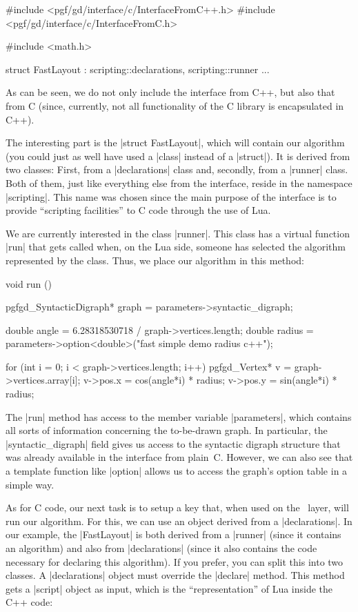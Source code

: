 \begin{codeexample}
#include <pgf/gd/interface/c/InterfaceFromC++.h>
#include <pgf/gd/interface/c/InterfaceFromC.h>

#include <math.h>

struct FastLayout : scripting::declarations, scripting::runner {
  ...
}
\end{codeexample}

As can be seen, we do not only include the interface from C++, but
also that from C (since, currently, not all functionality of the C
library is encapsulated in C++).

The interesting part is the |struct FastLayout|, which will contain our
algorithm (you could just as well have used a |class| instead of a
|struct|). It is derived from two classes: First, from a
|declarations| class and, secondly, from a |runner| class. Both of
them, just like everything else from the interface, reside in the
namespace |scripting|. This name was chosen since the main purpose of
the interface is to provide ``scripting facilities'' to C code through
the use of Lua.

We are currently interested in the class |runner|. This class has a
virtual function |run| that gets called when, on the Lua side, someone
has selected the algorithm represented by the class. Thus, we place
our algorithm in this method:

\begin{codeexample}
void run () {
  pgfgd_SyntacticDigraph* graph = parameters->syntactic_digraph;
    
  double angle  = 6.28318530718 / graph->vertices.length;
  double radius = parameters->option<double>("fast simple demo radius c++");
  
  for (int i = 0; i < graph->vertices.length; i++) {
    pgfgd_Vertex* v = graph->vertices.array[i];
    v->pos.x = cos(angle*i) * radius;
    v->pos.y = sin(angle*i) * radius;
  }
}
\end{codeexample}

The |run| method has access to the member variable |parameters|, which
contains all sorts of information concerning the to-be-drawn graph. In
particular, the |syntactic_digraph| field gives us access to the
syntactic digraph structure that was already available in the
interface from plain~C. However, we can also see that a template
function like |option| allows us to access the graph's option table in
a simple way.

As for C code, our next task is to setup a key that, when used on the
\tikzname\ layer, will run our algorithm. For this, we can use an
object derived from a |declarations|. In our example, the |FastLayout|
is both derived from a |runner| (since it contains an algorithm) and
also from |declarations| (since it also contains the code necessary for
declaring this algorithm). If you prefer, you can split this into two
classes. A |declarations| object must override the |declare|
method. This method gets a |script| object as input, which is the
``representation'' of Lua inside the C++ code:

